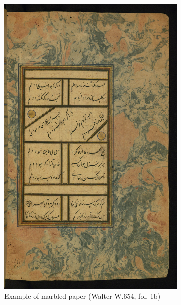 \begin{figure}[h!tp]
        \centering
	\begin{subfigure}[t]{0.3\textwidth}
		\includegraphics[width=\textwidth]{images/W654_000010_sap.jpg}
		\caption{Example of marbled paper (Walter W.654, fol. 1b)}
                \label{fig:ara_marble}
        \end{subfigure}
	\hfill
	\begin{subfigure}[t]{.3\textwidth}

\end{subfigure}
\end{figure}

